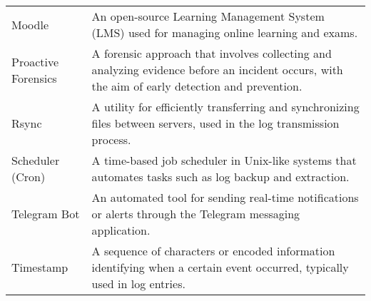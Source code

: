 \begin{longtable}{p{2.5cm} p{11.5cm}}
	Moodle & An open-source Learning Management System (LMS) used for managing online learning and exams.\\
	Proactive Forensics & A forensic approach that involves collecting and analyzing evidence before an incident occurs, with the aim of early detection and prevention.\\
	Rsync & A utility for efficiently transferring and synchronizing files between servers, used in the log transmission process.\\
	Scheduler (Cron) & A time-based job scheduler in Unix-like systems that automates tasks such as log backup and extraction.\\
	Telegram Bot & An automated tool for sending real-time notifications or alerts through the Telegram messaging application.\\
	Timestamp & A sequence of characters or encoded information identifying when a certain event occurred, typically used in log entries.\\
\end{longtable}


